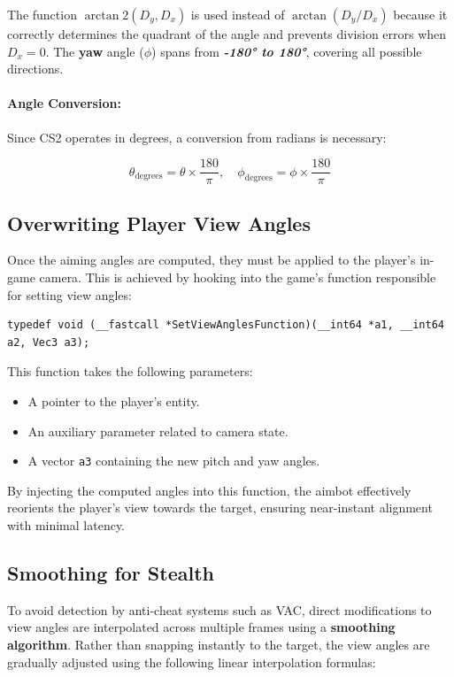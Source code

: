 The function \(\arctan2(D_y, D_x)\) is used instead of \(\arctan(D_y / D_x)\) because it correctly determines the quadrant of the angle and prevents division errors when \( D_x = 0 \). The \textbf{yaw} angle (\(\phi\)) spans from \textit{\textbf{-180° to 180°}}, covering all possible directions.

\paragraph{\textbf{Angle Conversion:}}  
Since CS2 operates in degrees, a conversion from radians is necessary:

\[
\theta_{\text{degrees}} = \theta \times \frac{180}{\pi}, \quad
\phi_{\text{degrees}} = \phi \times \frac{180}{\pi}
\]



\subsection{Overwriting Player View Angles}

Once the aiming angles are computed, they must be applied to the player’s in-game camera. This is achieved by hooking into the game’s function responsible for setting view angles:

\begin{lstlisting}[style=cppstyle, caption={Overwriting Player View Angles}]
typedef void (__fastcall *SetViewAnglesFunction)(__int64 *a1, __int64 a2, Vec3 a3);
\end{lstlisting}

This function takes the following parameters:
\begin{itemize}
    \item A pointer to the player’s entity.
    \item An auxiliary parameter related to camera state.
    \item A vector \texttt{a3} containing the new pitch and yaw angles.
\end{itemize}

By injecting the computed angles into this function, the aimbot effectively reorients the player's view towards the target, ensuring near-instant alignment with minimal latency.

\subsection{Smoothing for Stealth}

To avoid detection by anti-cheat systems such as VAC, direct modifications to view angles are interpolated across multiple frames using a \textbf{smoothing algorithm}. Rather than snapping instantly to the target, the view angles are gradually adjusted using the following linear interpolation formulas:

